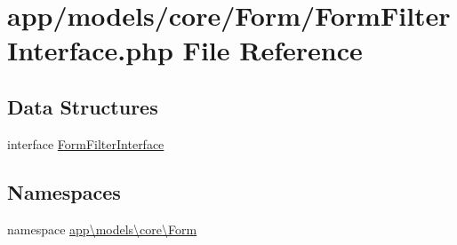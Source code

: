 \hypertarget{_form_filter_interface_8php}{\section{app/models/core/\-Form/\-Form\-Filter\-Interface.php File Reference}
\label{_form_filter_interface_8php}
}
\subsection*{Data Structures}
\begin{DoxyCompactItemize}
\item 
interface \hyperlink{interfaceapp_1_1models_1_1core_1_1_form_1_1_form_filter_interface}{Form\-Filter\-Interface}
\end{DoxyCompactItemize}
\subsection*{Namespaces}
\begin{DoxyCompactItemize}
\item 
namespace \hyperlink{namespaceapp_1_1models_1_1core_1_1_form}{app\textbackslash{}models\textbackslash{}core\textbackslash{}\-Form}
\end{DoxyCompactItemize}
